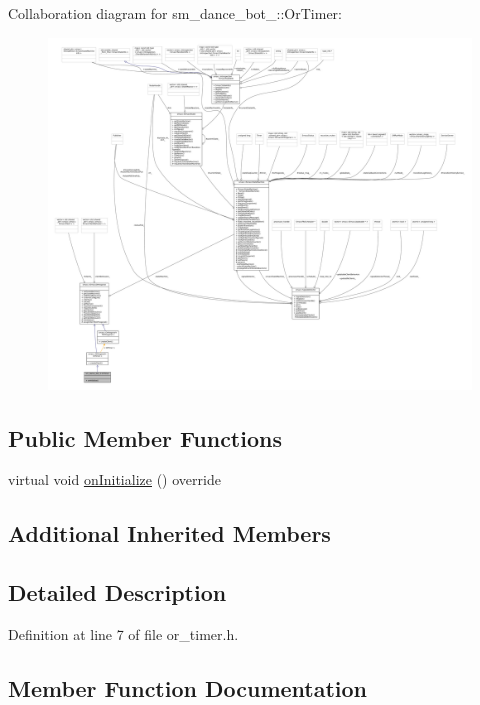 Collaboration diagram for sm\+\_\+dance\+\_\+bot\+\_\+:\+:Or\+Timer\+:
\nopagebreak
\begin{figure}[H]
\begin{center}
\leavevmode
\includegraphics[width=350pt]{classsm__dance__bot__3_1_1OrTimer__coll__graph}
\end{center}
\end{figure}
\subsection*{Public Member Functions}
\begin{DoxyCompactItemize}
\item 
virtual void \hyperlink{classsm__dance__bot__3_1_1OrTimer_af2d042c1391960e0eb3b3ecd53180672}{on\+Initialize} () override
\end{DoxyCompactItemize}
\subsection*{Additional Inherited Members}


\subsection{Detailed Description}


Definition at line 7 of file or\+\_\+timer.\+h.



\subsection{Member Function Documentation}
